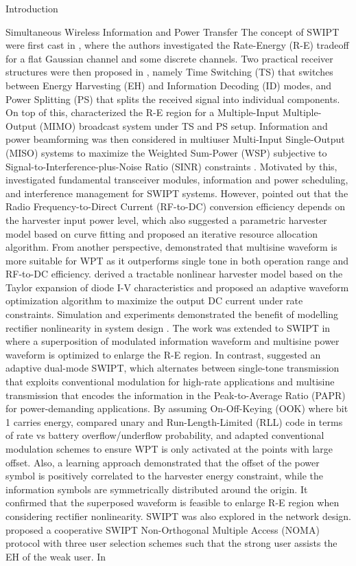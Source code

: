 \documentclass[journal]{IEEEtran}
\begin{document}
\begin{section}{Introduction}
\begin{subsection}{Simultaneous Wireless Information and Power Transfer}
		The concept of SWIPT were first cast in \cite{Varshney2008}, where the authors investigated the Rate-Energy (R-E) tradeoff for a flat Gaussian channel and some discrete channels. Two practical receiver structures were then proposed in \cite{Zhou2013}, namely Time Switching (TS) that switches between Energy Harvesting (EH) and Information Decoding (ID) modes, and Power Splitting (PS) that splits the received signal into individual components. On top of this, \cite{Zhang2013} characterized the R-E region for a Multiple-Input Multiple-Output (MIMO) broadcast system under TS and PS setup. Information and power beamforming was then considered in multiuser Multi-Input Single-Output (MISO) systems to maximize the Weighted Sum-Power (WSP) subjective to Signal-to-Interference-plus-Noise Ratio (SINR) constraints \cite{Xu2014}. Motivated by this, \cite{Krikidis2014} investigated fundamental transceiver modules, information and power scheduling, and interference management for SWIPT systems. However, \cite{Boshkovska2015} pointed out that the Radio Frequency-to-Direct Current (RF-to-DC) conversion efficiency depends on the harvester input power level, which also suggested a parametric harvester model based on curve fitting and proposed an iterative resource allocation algorithm. From another perspective, \cite{Trotter2009,Boaventura2011} demonstrated that multisine waveform is more suitable for WPT as it outperforms single tone in both operation range and RF-to-DC efficiency. \cite{Clerckx2016a} derived a tractable nonlinear harvester model based on the Taylor expansion of diode I-V characteristics and proposed an adaptive waveform optimization algorithm to maximize the output DC current under rate constraints. Simulation and experiments demonstrated the benefit of modelling rectifier nonlinearity in system design \cite{Kim2019,Kim2019a}. The work was extended to SWIPT in \cite{Clerckx2018} where a superposition of modulated information waveform and multisine power waveform is optimized to enlarge the R-E region. In contrast, \cite{Park2018} suggested an adaptive dual-mode SWIPT, which alternates between single-tone transmission that exploits conventional modulation for high-rate applications and multisine transmission that encodes the information in the Peak-to-Average Ratio (PAPR) for power-demanding applications. By assuming On-Off-Keying (OOK) where bit 1 carries energy, \cite{Hu2019} compared unary and Run-Length-Limited (RLL) code in terms of rate vs battery overflow/underflow probability, and adapted conventional modulation schemes to ensure WPT is only activated at the points with large offset. Also, a learning approach \cite{Varasteh2019c} demonstrated that the offset of the power symbol is positively correlated to the harvester energy constraint, while the information symbols are symmetrically distributed around the origin. It confirmed that the superposed waveform is feasible to enlarge R-E region when considering rectifier nonlinearity. SWIPT was also explored in the network design. \cite{Liu2016} proposed a cooperative SWIPT Non-Orthogonal Multiple Access (NOMA) protocol with three user selection schemes such that the strong user assists the EH of the weak user. In 
\end{subsection}
\end{section}
\end{document}
